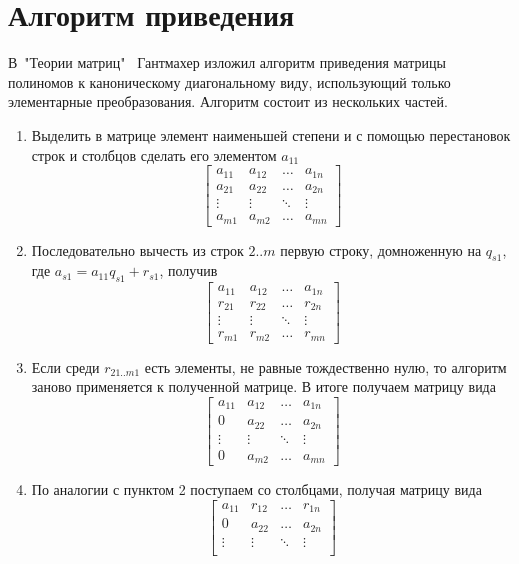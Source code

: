 \documentclass[14pt, a4paper]{extreport}
\begin{document}
	\section{Алгоритм приведения}
	В\ "Теории матриц"\ \cite{gantmaher} Гантмахер изложил алгоритм приведения матрицы полиномов
	к каноническому диагональному виду, использующий только элементарные
	преобразования. Алгоритм состоит из нескольких частей.
	\begin{enumerate}
		\item Выделить в матрице элемент наименьшей степени и
			с помощью перестановок строк и столбцов сделать его элементом $a_{11}$
			\[
				\begin{bmatrix}
					a_{11} & a_{12} & \dots & a_{1n} \\
					a_{21} & a_{22} & \dots & a_{2n} \\
					\vdots & \vdots & \ddots & \vdots \\
					a_{m1} & a_{m2} & \dots & a_{mn}
				\end{bmatrix}
			\]
		\item Последовательно вычесть из строк $2..m$ первую строку,
			домноженную на $q_{s1}$, где $a_{s1} = a_{11}q_{s1} + r_{s1}$, получив
			\[
				\begin{bmatrix}
					a_{11} & a_{12} & \dots & a_{1n} \\
					r_{21} & r_{22} & \dots & r_{2n} \\
					\vdots & \vdots & \ddots & \vdots \\
					r_{m1} & r_{m2} & \dots & r_{mn}
				\end{bmatrix}
			\]
		\item Если среди $r_{21..m1}$ есть элементы, не равные тождественно
			нулю, то алгоритм заново применяется к полученной матрице. В итоге
			получаем матрицу вида
			\[
				\begin{bmatrix}
					a_{11} & a_{12} & \dots & a_{1n} \\
					0 & a_{22} & \dots & a_{2n} \\
					\vdots & \vdots & \ddots & \vdots \\
					0 & a_{m2} & \dots & a_{mn}
				\end{bmatrix}
			\]
		\item По аналогии с пунктом 2 поступаем со столбцами, получая матрицу вида
			\[
				\begin{bmatrix}
					a_{11} & r_{12} & \dots & r_{1n} \\
					0 & a_{22} & \dots & a_{2n} \\
					\vdots & \vdots & \ddots & \vdots \\

\end{bmatrix}\]
\end{enumerate}
\end{document}
